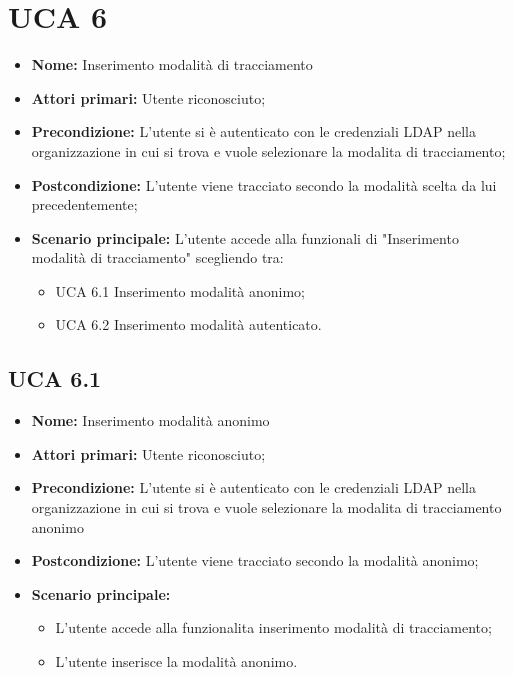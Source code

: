 \section{UCA 6}%
\begin{itemize}
\item \textbf{Nome:} Inserimento modalità di tracciamento
\item \textbf{Attori primari:} Utente riconosciuto;
\item \textbf{Precondizione:} L'utente si è autenticato con le credenziali LDAP nella organizzazione in cui si trova e vuole selezionare la modalita di tracciamento;
\item \textbf{Postcondizione:} L'utente viene tracciato secondo la modalità scelta da lui precedentemente; 
\item \textbf{Scenario principale:} L'utente accede alla funzionali di "Inserimento modalità di tracciamento" scegliendo tra:
	\begin{itemize}
		\item UCA 6.1 Inserimento modalità anonimo;
		\item UCA 6.2 Inserimento modalità autenticato.
	\end{itemize}
\end{itemize}

\subsection{UCA 6.1}%
\begin{itemize}
\item \textbf{Nome:} Inserimento modalità anonimo
\item \textbf{Attori primari:} Utente riconosciuto;
\item \textbf{Precondizione:} L'utente si è autenticato con le credenziali LDAP nella organizzazione in cui si trova e vuole selezionare la modalita di tracciamento anonimo
\item \textbf{Postcondizione:}  L'utente viene tracciato secondo la modalità anonimo;
\item \textbf{Scenario principale:}
	\begin{itemize}
	\item L'utente accede alla funzionalita inserimento modalità di tracciamento;
	\item L'utente inserisce la modalità anonimo.
\end{itemize}
\end{itemize}


